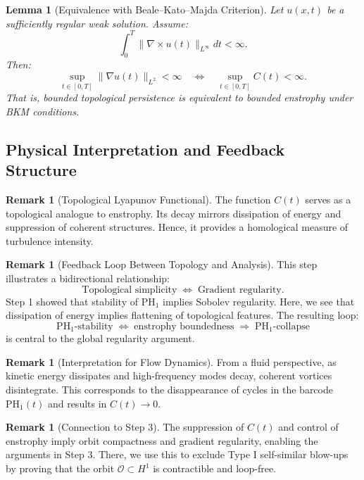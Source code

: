 \documentclass[11pt]{article}
\newtheorem{lemma}[theorem]{Lemma}
\theoremstyle{definition}
\newtheorem{remark}[theorem]{Remark}
\begin{document}
\begin{lemma}[Equivalence with Beale–Kato–Majda Criterion]
\label{lem:bkm_equiv}
Let $u(x,t)$ be a sufficiently regular weak solution. Assume:
\[
\int_0^T \|\nabla \times u(t)\|_{L^\infty} dt < \infty.
\]
Then:
\[
\sup_{t \in [0,T]} \|\nabla u(t)\|_{L^2} < \infty \quad \Leftrightarrow \quad \sup_{t \in [0,T]} C(t) < \infty.
\]
That is, bounded topological persistence is equivalent to bounded enstrophy under BKM conditions.
\end{lemma}

\subsection{Physical Interpretation and Feedback Structure}

\begin{remark}[Topological Lyapunov Functional]
The function $C(t)$ serves as a topological analogue to enstrophy. Its decay mirrors dissipation of energy and suppression of coherent structures. Hence, it provides a homological measure of turbulence intensity.
\end{remark}

\begin{remark}[Feedback Loop Between Topology and Analysis]
This step illustrates a bidirectional relationship:
\[
\text{Topological simplicity} \;\Longleftrightarrow\; \text{Gradient regularity}.
\]
Step 1 showed that stability of $\mathrm{PH}_1$ implies Sobolev regularity. Here, we see that dissipation of energy implies flattening of topological features. The resulting loop:
\[
\mathrm{PH}_1\text{-stability} \;\Leftrightarrow\; \text{enstrophy boundedness} \;\Rightarrow\; \mathrm{PH}_1\text{-collapse}
\]
is central to the global regularity argument.
\end{remark}

\begin{remark}[Interpretation for Flow Dynamics]
From a fluid perspective, as kinetic energy dissipates and high-frequency modes decay, coherent vortices disintegrate. This corresponds to the disappearance of cycles in the barcode $\mathrm{PH}_1(t)$ and results in $C(t) \to 0$.
\end{remark}

\begin{remark}[Connection to Step 3]
The suppression of $C(t)$ and control of enstrophy imply orbit compactness and gradient regularity, enabling the arguments in Step 3. There, we use this to exclude Type I self-similar blow-ups by proving that the orbit $\mathcal{O} \subset H^1$ is contractible and loop-free.
\end{remark}
\end{document}
